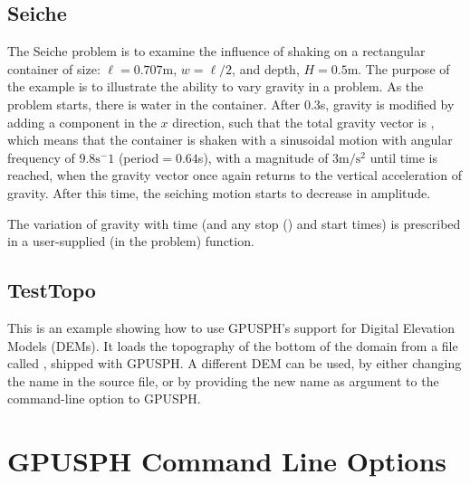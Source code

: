 \documentclass[12pt]{memoir}
\begin{document}
\subsection{Seiche}

The Seiche problem is to examine the influence of shaking on a
rectangular container of size: $\ell = 0.707$m, $w = \ell/2$, and depth,
$H = 0.5$m. The purpose of the example is to illustrate the ability to
vary gravity in a problem. As the problem starts, there is water in the
container. After $0.3$s, gravity is modified by adding a component in
the $x$ direction, such that the total gravity vector is
, which means that the container is shaken with a sinusoidal
motion with angular frequency of $9.8\text{s}^-1$ (period${} = 0.64$s),
with a magnitude of $3\text{m}/\text{s}^2$ until time 
is reached, when the gravity vector once again returns to the vertical
acceleration of gravity. After this time, the seiching motion starts to
decrease in amplitude.

\iffalse
\begin{figure}[h]
\centering{%
\texttt{[image: Seiche.png]}%
}
\caption{Resonant seiching in a rectangular domain showing the results
of a time varying gravity in the problem, \cmd{Seiche.cc}. Here the tank has
been shaking side to side at the resonant frequency of $0.638$s. The
color coding is for the pressure in the fluid.}
\end{figure}
\else
{}
\fi

The variation of gravity with time (and any stop () and
start times) is prescribed in a user-supplied (in the problem)
 function.

\subsection{TestTopo}

This is an example showing how to use GPUSPH's support for Digital
Elevation Models (DEMs). It loads the topography of the bottom of the
domain from a file called , shipped with GPUSPH.
A different DEM can be used, by either changing the name in the source
 file, or by providing the new name as argument to the
 command-line option to GPUSPH.


\section{GPUSPH Command Line Options}\label{options}
\end{document}
